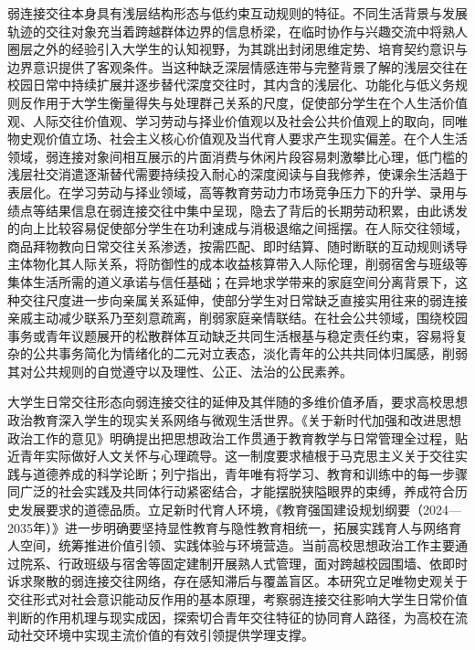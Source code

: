 弱连接交往本身具有浅层结构形态与低约束互动规则的特征。不同生活背景与发展轨迹的交往对象充当着跨越群体边界的信息桥梁，在临时协作与兴趣交流中将熟人圈层之外的经验引入大学生的认知视野，为其跳出封闭思维定势、培育契约意识与边界意识提供了客观条件。当这种缺乏深层情感连带与完整背景了解的浅层交往在校园日常中持续扩展并逐步替代深度交往时，其内含的浅层化、功能化与低义务规则反作用于大学生衡量得失与处理群己关系的尺度，促使部分学生在个人生活价值观、人际交往价值观、学习劳动与择业价值观以及社会公共价值观上的取向，同唯物史观价值立场、社会主义核心价值观及当代育人要求产生现实偏差。在个人生活领域，弱连接对象间相互展示的片面消费与休闲片段容易刺激攀比心理，低门槛的浅层社交消遣逐渐替代需要持续投入耐心的深度阅读与自我修养，使课余生活趋于表层化。在学习劳动与择业领域，高等教育劳动力市场竞争压力下的升学、录用与绩点等结果信息在弱连接交往中集中呈现，隐去了背后的长期劳动积累，由此诱发的向上比较容易促使部分学生在功利速成与消极退缩之间摇摆。在人际交往领域，商品拜物教向日常交往关系渗透，按需匹配、即时结算、随时断联的互动规则诱导主体物化其人际关系，将防御性的成本收益核算带入人际伦理，削弱宿舍与班级等集体生活所需的道义承诺与信任基础；在异地求学带来的家庭空间分离背景下，这种交往尺度进一步向亲属关系延伸，使部分学生对日常缺乏直接实用往来的弱连接亲戚主动减少联系乃至刻意疏离，削弱家庭亲情联结。在社会公共领域，围绕校园事务或青年议题展开的松散群体互动缺乏共同生活根基与稳定责任约束，容易将复杂的公共事务简化为情绪化的二元对立表态，淡化青年的公共共同体归属感，削弱其对公共规则的自觉遵守以及理性、公正、法治的公民素养。

大学生日常交往形态向弱连接交往的延伸及其伴随的多维价值矛盾，要求高校思想政治教育深入学生的现实关系网络与微观生活世界。《关于新时代加强和改进思想政治工作的意见》明确提出把思想政治工作贯通于教育教学与日常管理全过程，贴近青年实际做好人文关怀与心理疏导\cite{CPCC2021_Yijian}。这一制度要求植根于马克思主义关于交往实践与道德养成的科学论断；列宁指出，青年唯有将学习、教育和训练中的每一步骤同广泛的社会实践及共同体行动紧密结合，才能摆脱狭隘眼界的束缚，养成符合历史发展要求的道德品质\cite{Lenin2017}。立足新时代育人环境，《教育强国建设规划纲要（2024—2035年）》进一步明确要坚持显性教育与隐性教育相统一，拓展实践育人与网络育人空间，统筹推进价值引领、实践体验与环境营造\cite{CPCC2025_Gangyao}。当前高校思想政治工作主要通过院系、行政班级与宿舍等固定建制开展熟人式管理，面对跨越校园围墙、依即时诉求聚散的弱连接交往网络，存在感知滞后与覆盖盲区。本研究立足唯物史观关于交往形式对社会意识能动反作用的基本原理，考察弱连接交往影响大学生日常价值判断的作用机理与现实成因，探索切合青年交往特征的协同育人路径，为高校在流动社交环境中实现主流价值的有效引领提供学理支撑。

